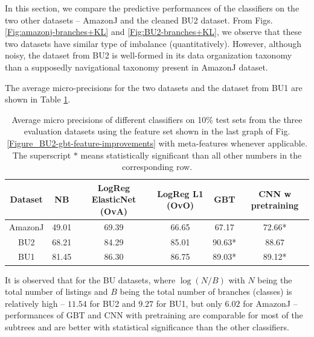 \vspace{-0.2cm}


In this section, we compare the predictive performances of the classifiers on the two other datasets -- AmazonJ and the cleaned BU2 dataset.
From Figs. \ref{Fig:amazonj-branches+KL} and \ref{Fig:BU2-branches+KL}, we observe that these two datasets have similar type of imbalance (quantitatively).
However, although noisy, the dataset from BU2 is well-formed in its data organization taxonomy than a supposedly navigational taxonomy present in AmazonJ dataset.

The average micro-precisions for the two datasets and the dataset from BU1 are shown in Table \ref*{Table:average-prediction}. 
\begin{table}
	\vspace{-0.7cm}
	\centering
	{\small{
	\begin{tabular}{c c c c c c} \\ \hline 
		Dataset & NB &	LogReg ElasticNet (OvA) &	LogReg L1 (OvO) &	GBT	& CNN w pretraining  \\ \hline
		AmazonJ & 49.01	& 69.39 &	66.65 &	67.17 &	72.66* \\  
		BU2 & 68.21	& 84.29	& 85.01	& 90.63*	& 88.67 \\  
		BU1 & 81.45	& 86.30	& 86.75	& 89.03*	& 89.12* \\  \hline
	\end{tabular}
	}}
	\vspace{-0.4cm}
	\caption{\small{Average micro precisions of different classifiers on 10\% test sets from the three evaluation datasets using the feature set shown in the last graph of Fig. \ref{Figure_BU2-gbt-feature-improvements} with meta-features whenever applicable. The superscript $*$ means statistically significant than all other numbers in the corresponding row.}}
	\label{Table:average-prediction}
	\vspace{-0.3cm}
\end{table}
It is observed that for the BU datasets, where $\log(N/B)$ with $N$ being the total number of listings and $B$ being the total number of branches (classes) is relatively high -- $11.54$ for BU2 and $9.27$ for BU1, but only $6.02$ for AmazonJ -- performances of GBT and CNN with pretraining are comparable for most of the subtrees and are better with statistical significance than the other classifiers.

